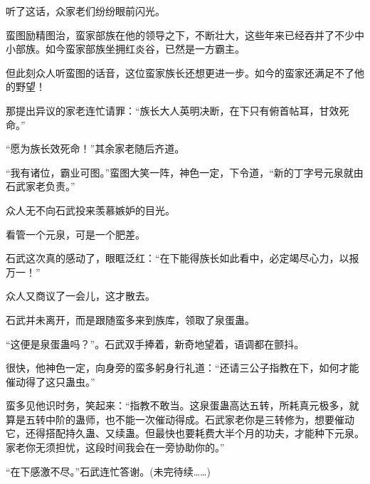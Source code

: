 \begin{this_body}
听了这话，众家老们纷纷眼前闪光。

蛮图励精图治，蛮家部族在他的领导之下，不断壮大，这些年来已经吞并了不少中小部族。如今蛮家部族坐拥红炎谷，已然是一方霸主。

但此刻众人听蛮图的话音，这位蛮家族长还想更进一步。如今的蛮家还满足不了他的野望！

那提出异议的家老连忙请罪：“族长大人英明决断，在下只有俯首帖耳，甘效死命。”

“愿为族长效死命！”其余家老随后齐道。

“我有诸位，霸业可图。”蛮图大笑一阵，神色一定，下令道，“新的丁字号元泉就由石武家老负责。”

众人无不向石武投来羡慕嫉妒的目光。

看管一个元泉，可是一个肥差。

石武这次真的感动了，眼眶泛红：“在下能得族长如此看中，必定竭尽心力，以报万一！”

众人又商议了一会儿，这才散去。

石武并未离开，而是跟随蛮多来到族库，领取了泉蛋蛊。

“这便是泉蛋蛊吗？”。石武双手捧着，新奇地望着，语调都在颤抖。

很快，他神色一定，向身旁的蛮多躬身行礼道：“还请三公子指教在下，如何才能催动得了这只蛊虫。”

蛮多见他识时务，笑起来：“指教不敢当。这泉蛋蛊高达五转，所耗真元极多，就算是五转中阶的蛊师，也不能一次催动得成。石武家老你是三转修为，想要催动它，还得搭配持久蛊、又续蛊。但最快也要耗费大半个月的功夫，才能种下元泉。家老你无须担忧，这段时间我会在一旁协助你的。”

“在下感激不尽。”石武连忙答谢。(未完待续……)

\end{this_body}

